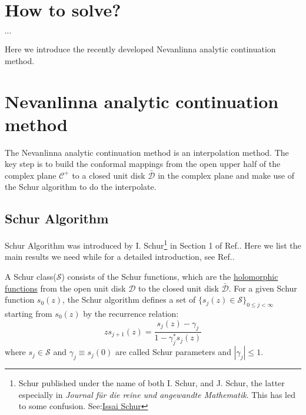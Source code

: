 \documentclass[
	preprint,%
	aps,
	prb,
	showpacs,	
	amsmath, amssymb]{revtex4-2}
\newcommand{\C}{ {\mathcal{C}} }
\newcommand{\D}{ {\mathcal{D}} }
\newcommand{\Dbar}{ {\bar{\mathcal{D}}} }
\begin{document}
\section{How to solve?}
\label{sec:how-to-solve}

$\cdots$

Here we introduce the recently developed Nevanlinna 
analytic continuation method\cite{fei2021nevanlinna}.      
\section{Nevanlinna analytic continuation method}
\label{sec:nevanlinna-analytical-continuation-method}

The Nevanlinna analytic continuation method\cite{fei2021nevanlinna} 
is an interpolation method. The key step is to build the conformal mappings 
from the open upper half of the complex plane $\C^+$ 
to a closed unit disk $\Dbar$ in the complex plane and 
make use of the Schur algorithm
\cite{schur1917potenzreihen,schur1918potenzreihen,dym2003contributions} 
to do the interpolate.

\subsection{Schur Algorithm}
\label{subsec:schur-algorithm}

Schur Algorithm was introduced by I. Schur\footnote{Schur 
	published under the name of both I. Schur, 
	and J. Schur, the latter especially in  
	\textit{Journal für die reine 
	und angewandte Mathematik}. This has led to some confusion.
	See:\href{https://en.wikipedia.org/wiki/Issai_Schur#cite_note-2}{Issai Schur}} 
in Section 1 of Ref.\cite{schur1917potenzreihen}.
Here we list the main results we need while
for a detailed introduction, see Ref.\cite{dym2003contributions}. 

A Schur class($\mathcal{S}$) consists of the Schur functions, which are the 
\href{https://en.wikipedia.org/wiki/Holomorphic_function}{holomorphic functions} 
from the open unit disk $\D$ to 
the closed unit disk $\Dbar$. 
For a given Schur function $s_0(z)$, the Schur algorithm defines a set of
$\{s_j(z) \in \mathcal{S}\}_{0\leq j <\infty}$ starting from $s_0(z)$ by the recurrence relation:
\begin{equation}\label{eq:schur-function-recursion}
	zs_{j+1}(z) = \frac{s_j(z) - \gamma_j}{1 - \gamma_j^* s_j(z)}
\end{equation}
where $s_j \in \mathcal{S}$ and $\gamma_j \equiv s_j(0)$ are called Schur 
parameters and $|\gamma_j| \leq 1$. 
\end{document}
